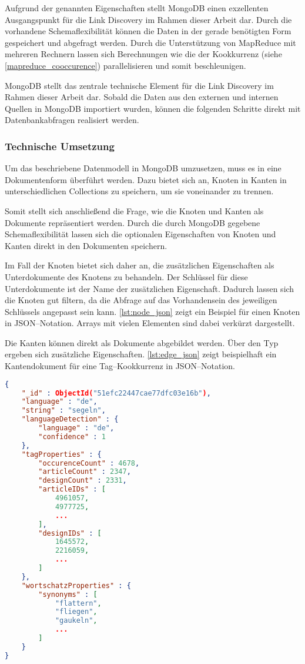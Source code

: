 Aufgrund der genannten Eigenschaften stellt MongoDB einen exzellenten Ausgangspunkt für die Link Discovery im Rahmen dieser Arbeit dar. Durch die vorhandene Schemaflexibilität können die Daten in der gerade benötigten Form gespeichert und abgefragt werden. Durch die Unterstützung von MapReduce mit mehreren Rechnern lassen sich Berechnungen wie die der Kookkurrenz (siehe \cref{mapreduce_cooccurence}) parallelisieren und somit beschleunigen.

MongoDB stellt das zentrale technische Element für die Link Discovery im Rahmen dieser Arbeit dar. Sobald die Daten aus den externen und internen Quellen in MongoDB importiert wurden, können die folgenden Schritte direkt mit Datenbankabfragen realisiert werden.

\subsubsection{Technische Umsetzung}

Um das beschriebene Datenmodell in MongoDB umzusetzen, muss es in eine Dokumentenform überführt werden. Dazu bietet sich an, Knoten in Kanten in unterschiedlichen Collections zu speichern, um sie voneinander zu trennen.

Somit stellt sich anschließend die Frage, wie die Knoten und Kanten als Dokumente repräsentiert werden. Durch die durch MongoDB gegebene Schemaflexibilität lassen sich die optionalen Eigenschaften von Knoten und Kanten direkt in den Dokumenten speichern.

Im Fall der Knoten bietet sich daher an, die zusätzlichen Eigenschaften als Unterdokumente des Knotens zu behandeln. Der Schlüssel für diese Unterdokumente ist der Name der zusätzlichen Eigenschaft. Dadurch lassen sich die Knoten gut filtern, da die Abfrage auf das Vorhandensein des jeweiligen Schlüssels angepasst sein kann. \cref{lst:node_json} zeigt ein Beispiel für einen Knoten in JSON--Notation. Arrays mit vielen Elementen sind dabei verkürzt dargestellt.

Die Kanten können direkt als Dokumente abgebildet werden. Über den Typ ergeben sich zusätzliche Eigenschaften. \cref{lst:edge_json} zeigt beispielhaft ein Kantendokument für eine Tag--Kookkurrenz in JSON--Notation.

\begin{lstlisting}[language=json, label={lst:node_json}, caption={Knotendokument in JSON}]
{
    "_id" : ObjectId("51efc22447cae77dfc03e16b"),
    "language" : "de",
    "string" : "segeln",
    "languageDetection" : {
        "language" : "de",
        "confidence" : 1
    },
    "tagProperties" : {
        "occurenceCount" : 4678,
        "articleCount" : 2347,
        "designCount" : 2331,
        "articleIDs" : [ 
            4961057, 
            4977725, 
            ...
        ],
        "designIDs" : [ 
            1645572, 
            2216059, 
            ...
        ]
    },
    "wortschatzProperties" : {
        "synonyms" : [ 
            "flattern", 
            "fliegen", 
            "gaukeln", 
            ...
        ]
    }
}
\end{lstlisting}

